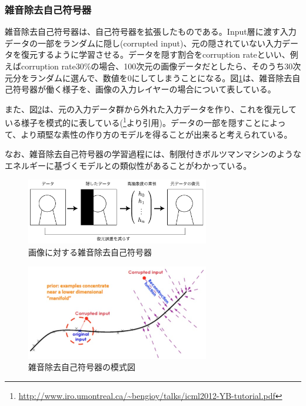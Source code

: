 \subsubsection{雑音除去自己符号器}
雑音除去自己符号器は、自己符号器を拡張したものである。Input層に渡す入力データの一部をランダムに隠し(corrupted input)、元の隠されていない入力データを復元するように学習させる。データを隠す割合をcorruption rateといい、例えばcorruption rate30\%の場合、100次元の画像データだとしたら、そのうち30次元分をランダムに選んで、数値を0にしてしまうことになる。図\ref{c3_da_pic}は、雑音除去自己符号器が働く様子を、画像の入力レイヤーの場合について表している。\par
また、図\ref{c3_da}は、元の入力データ群から外れた入力データを作り、これを復元している様子を模式的に表している(\footnote{\url{http://www.iro.umontreal.ca/~bengioy/talks/icml2012-YB-tutorial.pdf}}より引用)。データの一部を隠すことによって、より頑堅な素性の作り方のモデルを得ることが出来ると考えられている。\par
なお、雑音除去自己符号器の学習過程には、制限付きボルツマンマシンのようなエネルギーに基づくモデルとの類似性があることがわかっている\cite{vincent2011a-connection}。
\begin{figure}[tbp]
 \begin{center}
  \includegraphics[width=80mm]{img/c3/da_pic}
 \end{center}
 \caption{画像に対する雑音除去自己符号器}
 \label{c3_da_pic}
\end{figure}

\begin{figure}[tbp]
 \begin{center}
  \includegraphics[width=80mm]{img/c3/da}
 \end{center}
 \caption{雑音除去自己符号器の模式図}
 \label{c3_da}
\end{figure}

